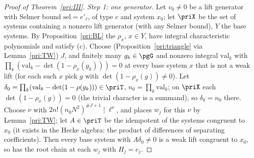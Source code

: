 \documentclass[10pt]{amsart}
\theoremstyle{definition}
\theoremstyle{remark}
\begin{document}
\begin{proof}[Proof of Theorem~\ref{pri:III}]
\emph{Step 1: one generator.} Let $v_0\ne0$ be a lift generator with Selmer bound $\mathrm{sel}=
e'_\ell$, of type $c$ and system $x_0$; let $\priX$ be the set of systems containing a nonzero lift
generator (with any Selmer bound), $Y$ the base systems. By Proposition~\ref{pri:BL} the $\rho_x$,
$x\in Y$, have integral characteristic polynomials and satisfy (c). Choose (Proposition~\ref{pri:triangle}
via Lemma~\ref{pri:TW}) $J$, and finitely many $g_k\in\pgG$ and nonzero integral $\mathrm{val}_k$ with
$\prod_k(\mathrm{val}_k-\det(1-\rho_x(g_k)))=0$ at every base system $x$ that is not a weak lift (for
each such $x$ pick $g$ with $\det(1-\rho_x(g))\ne0$). Let $\delta_0=\prod_k(\mathrm{val}_k-\det(1-
\rho(g_k)))\in\priT$, $n_0=\prod_k\mathrm{val}_k$; on $\priX$ each $\det(1-\rho_x(g))=0$ (the trivial
character is a summand), so $\delta_0=n_0$ there. Choose $\nu$ with $2n!(n_0N^2)^{\#J+1}\mid\ell^\nu$,
and places $w_j$ for this $\nu$ by Lemma~\ref{pri:TW}; let $A\in\priT$ be the idempotent of the
systems congruent to $x_0$ (it exists in the Hecke algebra: the product of differences of separating
coefficients). Then every base system with $A\delta_0\ne0$ is a
weak lift congruent to $x_0$, so has the root chain at each $w_j$ with $H_j=e_j$.


\end{proof}
\end{document}
